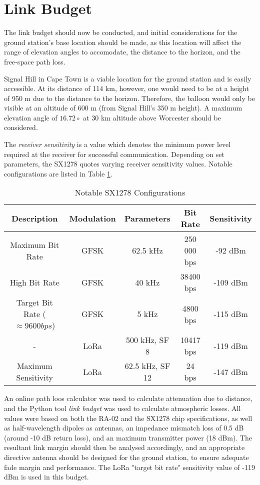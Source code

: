 \section{Link Budget}

The link budget should now be conducted, and initial considerations for the ground station's base location should be made, as this location will affect the range of elevation angles to accomodate, the distance to the horizon, and the free-space path loss.

Signal Hill in Cape Town is a viable location for the ground station and is easily accessible. At its distance of 114 km, however, one would need to be at a height of 950 m due to the distance to the horizon. Therefore, the balloon would only be visible at an altitude of 600 m (from Signal Hill's 350 m height). A maximum elevation angle of $16.72 \circ$ at 30 km altitude above Worcester should be considered.

The \textit{receiver sensitivity} is a value which denotes the minimum power level required at the receiver for successful communication. Depending on set parameters, the SX1278 quotes varying receiver sensitivity values. Notable configurations are listed in Table \ref{tab:sensitivity_values}.
\begin{table}[!htb]
  \centering
  \renewcommand{\arraystretch}{1.2}
  \begin{tabular}{ |c|c|c|c|c| }
  \hline
  \textbf{Description} & \textbf{Modulation} & \textbf{Parameters} & \textbf{Bit Rate} & \textbf{Sensitivity} \\
  \hline
  Maximum Bit Rate &
  GFSK &
  62.5 kHz &
  250 000 bps &
  -92 dBm \\
  \hline
  High Bit Rate &
  GFSK &
  40 kHz &
  38400 bps &
  -109 dBm \\
  \hline
  Target Bit Rate ($\approx 9600 bps$) &
  GFSK &
  5 kHz &
  4800 bps &
  -115 dBm \\
  \hline
  - &
  LoRa &
  500 kHz, SF 8 &
  10417 bps &
  -119 dBm \\
  \hline
  Maximum Sensitivity &
  LoRa &
  62.5 kHz, SF 12 &
  24 bps &
  -147 dBm \\
  \hline
  \end{tabular}
  \caption{Notable SX1278 Configurations}
  \label{tab:sensitivity_values}
\end{table}

An online path loos calculator was used to calculate attenuation due to distance, and the Python tool \textit{link budget} was used to calculate atmospheric losses. All values were based on both the RA-02 and the SX1278 chip specifications, as well as half-wavelength dipoles as antennas, an impedance mismatch loss of 0.5 dB (around -10 dB return loss), and an maximum transmitter power (18 dBm). The resultant link margin should then be analysed accordingly, and an appropriate directive antenna should be designed for the ground station, to ensure adequate fade margin and performance. The LoRa "target bit rate" sensitivity value of -119 dBm is used in this budget.

